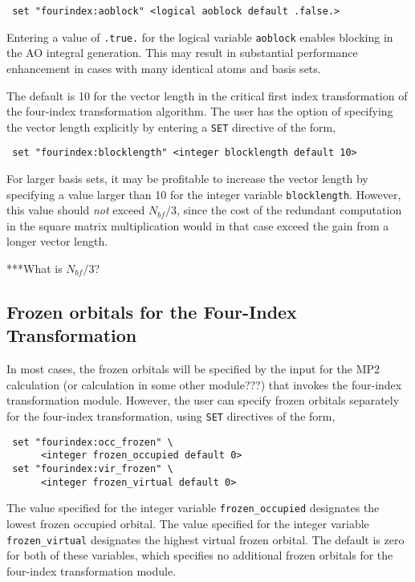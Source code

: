 \begin{verbatim}
 set "fourindex:aoblock" <logical aoblock default .false.>
\end{verbatim}

Entering a value of \verb+.true.+ for the logical variable \verb+aoblock+ 
enables blocking in the AO integral generation. This may result in 
substantial performance enhancement in cases with many identical 
atoms and basis sets.

The default is 10 for the vector length in the critical first index 
transformation of the four-index transformation algorithm.  The user has
the option of specifying the vector length explicitly by entering a 
\verb+SET+ directive of the form,

\begin{verbatim}
 set "fourindex:blocklength" <integer blocklength default 10>
\end{verbatim}


For larger basis sets, it may be profitable to increase the vector
length by specifying a value larger than 10 for the integer variable
\verb+blocklength+.  However, this value should {\em
  not} exceed $N_{bf} / 3$, since the cost of the redundant computation 
in the square matrix multiplication would in that case exceed the 
gain from a longer vector length.

\Large
***What is $N_{bf} / 3$?

\subsection{Frozen orbitals for the Four-Index Transformation}

In most cases, the frozen orbitals will be specified by the input for the 
MP2 calculation (or calculation in some other module???) that invokes the
four-index transformation module.  However, the user can specify frozen
orbitals separately for the four-index transformation, using \verb+SET+
directives of the form,

\begin{verbatim}
 set "fourindex:occ_frozen" \
      <integer frozen_occupied default 0>
 set "fourindex:vir_frozen" \
      <integer frozen_virtual default 0>
\end{verbatim}

The value specified for the integer variable \verb+frozen_occupied+ 
designates the lowest frozen occupied orbital.  The value specified
for the integer variable \verb+frozen_virtual+ designates the highest
virtual frozen orbital.  The default is zero for both of these variables,
which specifies no additional frozen orbitals for the four-index
transformation module.

